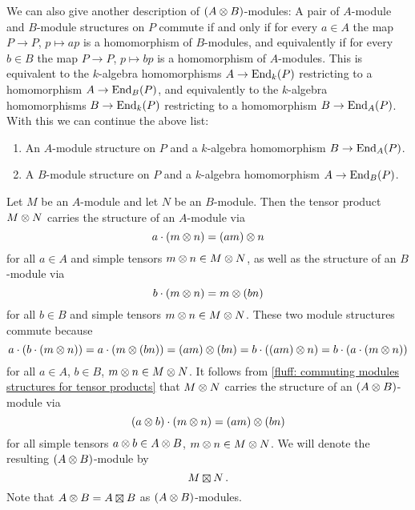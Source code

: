 \begin{fluff}
  We can also give another description of $(A \mathbin{\otimes} B)$-modules:
  A pair of $A$-module and $B$-module structures on $P$ commute if and only if for every $a \in A$ the map $P \to P$, $p \mapsto ap$ is a homomorphism of $B$-modules, and equivalently if for every $b \in B$ the map $P \to P$, $p \mapsto bp$ is a homomorphism of $A$-modules.
  This is equivalent to the $k$-algebra homomorphisms $A \to \operatorname{End}_k(P)$ restricting to a homomorphism $A \to \operatorname{End}_B(P)$, and equivalently to the $k$-algebra homomorphisms $B \to \operatorname{End}_k(P)$ restricting to a homomorphism $B \to \operatorname{End}_A(P)$.
  With this we can continue the above list:
  \begin{enumerate}[resume]
    \item
      An $A$-module structure on $P$ and a $k$-algebra homomorphism $B \to \operatorname{End}_A(P)$.
    \item
      A $B$-module structure on $P$ and a $k$-algebra homomorphism $A \to \operatorname{End}_B(P)$.
  \end{enumerate}
\end{fluff}


\begin{fluff}
  \label{fluff: construction of boxtimes}
  Let $M$ be an $A$-module and let $N$ be an $B$-module.
  Then the tensor product $M \mathbin{\otimes} N$ carries the structure of an $A$-module via
  \[
      a \cdot (m \mathbin{\otimes} n)
    = (am) \mathbin{\otimes} n
  \]
  for all $a \in A$ and simple tensors $m \mathbin{\otimes} n \in M \mathbin{\otimes} N$, as well as the structure of an $B$-module via
  \[
      b \cdot (m \mathbin{\otimes} n)
    = m \mathbin{\otimes} (bn)
  \]
  for all $b \in B$ and simple tensors $m \mathbin{\otimes} n \in M \mathbin{\otimes} N$.
  These two module structures commute because
  \[
      a \cdot (b \cdot (m \mathbin{\otimes} n))
    = a \cdot (m \mathbin{\otimes} (bn))
    = (am) \mathbin{\otimes} (bn)
    = b \cdot ((am) \mathbin{\otimes} n)
    = b \cdot (a \cdot (m \mathbin{\otimes} n))
  \]
  for all $a \in A$, $b \in B$, $m \mathbin{\otimes} n \in M \mathbin{\otimes} N$.
  It follows from \ref{fluff: commuting modules structures for tensor products} that $M \mathbin{\otimes} N$ carries the structure of an $(A \mathbin{\otimes} B)$-module via
  \[
      (a \mathbin{\otimes} b) \cdot (m \mathbin{\otimes} n)
    = (am) \mathbin{\otimes} (bn)
  \]
  for all simple tensors $a \mathbin{\otimes} b \in A \mathbin{\otimes} B$, $m \mathbin{\otimes} n \in M \mathbin{\otimes} N$.
  We will denote the resulting $(A \mathbin{\otimes} B)$-module by
  \[
    M \outertensor N \,.
  \]
  Note that $A \tensor B = A \outertensor B$ as $(A \mathbin{\otimes} B)$-modules.
\end{fluff}


